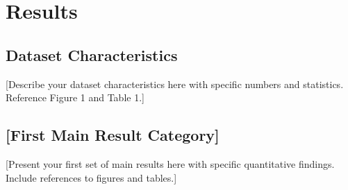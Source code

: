 
\section{Results}


\subsection{Dataset Characteristics}


[Describe your dataset characteristics here with specific numbers and statistics.
Reference Figure 1 and Table 1.]


\subsection{[First Main Result Category]}


[Present your first set of main results here with specific quantitative findings.
Include references to figures and tables.]


